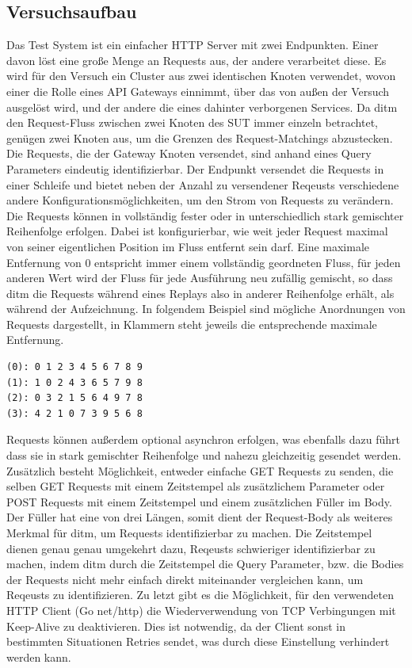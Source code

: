 \documentclass[12pt,a4paper]{report}
\begin{document}
\subsection{Versuchsaufbau}
Das Test System ist ein einfacher HTTP Server mit zwei Endpunkten. Einer davon löst
eine große Menge an Requests aus, der andere verarbeitet diese. Es wird für den Versuch ein Cluster aus zwei identischen
Knoten verwendet, wovon einer die Rolle eines API Gateways einnimmt, über das von außen der Versuch ausgelöst wird,
und der andere die eines dahinter verborgenen Services. Da ditm den Request-Fluss zwischen zwei Knoten des SUT immer einzeln
betrachtet, genügen zwei Knoten aus, um die Grenzen des Request-Matchings abzustecken.
Die Requests, die der Gateway Knoten versendet, sind anhand eines Query Parameters eindeutig identifizierbar.
Der Endpunkt versendet die Requests in einer Schleife und bietet neben der Anzahl zu versendener Reqeusts verschiedene
andere Konfigurationsmöglichkeiten, um den Strom von Requests zu verändern.
Die Requests können in vollständig fester oder in unterschiedlich stark gemischter Reihenfolge erfolgen. Dabei ist konfigurierbar,
wie weit jeder Request maximal von seiner eigentlichen Position im Fluss entfernt sein darf. Eine maximale Entfernung
von 0 entspricht immer einem vollständig geordneten Fluss, für jeden anderen Wert wird der Fluss für jede Ausführung neu
zufällig gemischt, so dass ditm die Requests während eines Replays also in anderer Reihenfolge erhält, als während der
Aufzeichnung. In folgendem Beispiel sind mögliche Anordnungen von Requests dargestellt, in Klammern steht jeweils die
entsprechende maximale Entfernung.
\begin{verbatim}
(0): 0 1 2 3 4 5 6 7 8 9
(1): 1 0 2 4 3 6 5 7 9 8
(2): 0 3 2 1 5 6 4 9 7 8
(3): 4 2 1 0 7 3 9 5 6 8
\end{verbatim}
Requests können außerdem optional asynchron erfolgen, was ebenfalls dazu führt dass sie in stark gemischter Reihenfolge und nahezu gleichzeitig
gesendet werden.
Zusätzlich besteht Möglichkeit, entweder einfache GET Requests zu senden, die selben GET Requests mit einem Zeitstempel
als zusätzlichem Parameter oder POST Requests mit einem Zeitstempel und einem zusätzlichen Füller im Body. Der Füller hat eine von
drei Längen, somit dient der Request-Body als weiteres Merkmal für ditm, um Requests identifizierbar zu machen. Die Zeitstempel dienen
genau genau umgekehrt dazu, Reqeusts schwieriger identifizierbar zu machen, indem ditm durch die Zeitstempel die Query Parameter,
bzw. die Bodies der Requests nicht mehr einfach direkt miteinander vergleichen kann, um Reqeusts zu identifizieren.
Zu letzt gibt es die Möglichkeit, für den verwendeten HTTP Client (Go net/http) die Wiederverwendung von TCP Verbingungen mit Keep-Alive
zu deaktivieren. Dies ist notwendig, da der Client sonst in bestimmten Situationen Retries sendet, was durch diese Einstellung
verhindert werden kann.
\end{document}
